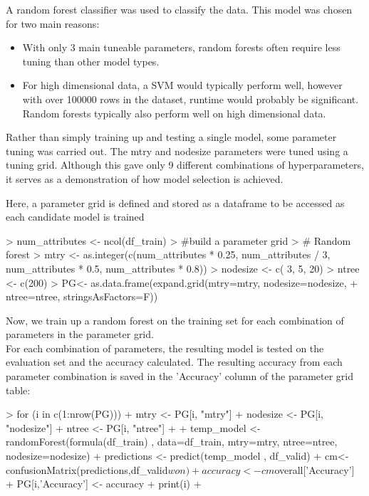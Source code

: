 \documentclass[10pt]{article}
\begin{document}
A random forest classifier was used to classify the data. This model was chosen for two main reasons:
\begin{itemize}
  \item With only 3 main tuneable parameters, random forests often require less tuning than other model types.
  \item For high dimensional data, a SVM would typically perform well, however with over 100000 rows in the dataset, runtime would probably be significant. Random forests typically also perform well on high dimensional data.
\end{itemize}


Rather than simply training up and testing a single model, some parameter tuning was carried out. The mtry and nodesize parameters were tuned using a tuning grid. Although this gave only 9 different combinations of hyperparameters, it serves as a demonstration of how model selection is achieved.

Here, a parameter grid is defined and stored as a dataframe to be accessed as each candidate model is trained
\begin{Schunk}
\begin{Sinput}
> num_attributes <- ncol(df_train)
> #build a parameter grid
> # Random forest
> mtry <- as.integer(c(num_attributes * 0.25, num_attributes / 3, num_attributes * 0.5, num_attributes * 0.8))
> nodesize <- c( 3, 5, 20)
> ntree <- c(200)
> PG<- as.data.frame(expand.grid(mtry=mtry, nodesize=nodesize,
+                                          ntree=ntree, stringsAsFactors=F))
\end{Sinput}
\end{Schunk}
Now, we train up a random forest on the training set for each combination of parameters in the parameter grid. \\
For each combination of parameters, the resulting model is tested on the evaluation set and the accuracy calculated.
The resulting accuracy from each parameter combination is saved in the 'Accuracy' column of the parameter grid table:
\begin{Schunk}
\begin{Sinput}
> for (i in c(1:nrow(PG))){
+   mtry <- PG[i, "mtry"]
+   nodesize <- PG[i, "nodesize"]
+   ntree <- PG[i, "ntree"]
+ 
+   temp_model <- randomForest(formula(df_train) , data=df_train, mtry=mtry, ntree=ntree, nodesize=nodesize)
+   predictions <- predict(temp_model , df_valid)
+   cm<- confusionMatrix(predictions,df_valid$won)
+   accuracy <- cm$overall['Accuracy']
+   PG[i,'Accuracy'] <- accuracy
+   print(i)
+ }
\end{Sinput}
\end{Schunk}
\end{document}
